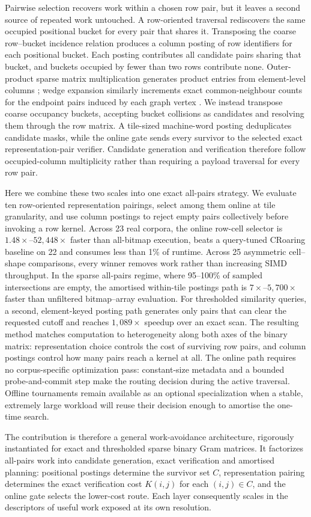 Pairwise selection recovers work within a chosen row pair, but it leaves a second source of repeated
work untouched. A row-oriented traversal rediscovers the same occupied positional bucket for every
pair that shares it. Transposing the coarse row--bucket incidence relation produces a column posting
of row identifiers for each positional bucket. Each posting contributes all candidate pairs sharing
that bucket, and buckets occupied by fewer than two rows contribute none. Outer-product sparse
matrix multiplication generates product entries from element-level columns
\cite{gustavson1978spgemm,buluc2011combinatorialblas}; wedge expansion similarly increments exact
common-neighbour counts for the endpoint pairs induced by each graph vertex
\cite{an2019skipintersection}. We instead transpose coarse occupancy buckets, accepting bucket
collisions as candidates and resolving them through the row matrix. A tile-sized machine-word
posting deduplicates candidate masks, while the online gate sends every survivor to the selected
exact representation-pair verifier. Candidate
generation and verification therefore follow occupied-column multiplicity rather than requiring a
payload traversal for every row pair.

Here we combine these two scales into one exact all-pairs strategy. We evaluate ten row-oriented
representation pairings, select among them online at tile granularity, and use column postings to
reject empty pairs collectively before invoking a row kernel. Across 23 real corpora, the online
row-cell selector is $1.48\times$--$52{,}448\times$ faster than all-bitmap execution, beats a
query-tuned CRoaring baseline on 22 and consumes less than 1\% of runtime.
Across 25 asymmetric cell--shape comparisons, every winner removes work rather than increasing SIMD
throughput. In the sparse all-pairs regime, where 95--100\% of sampled intersections are empty, the
amortised within-tile postings path is $7\times$--$5{,}700\times$ faster than unfiltered
bitmap--array evaluation. For thresholded similarity queries, a second, element-keyed posting path
generates only pairs that can clear the requested cutoff and reaches $1{,}089\times$ speedup over an
exact scan. The resulting method matches computation to heterogeneity along both axes of the binary
matrix: representation choice controls the cost of surviving row pairs, and column postings control
how many pairs reach a kernel at all. The online path requires no corpus-specific optimization pass:
constant-size metadata and a bounded probe-and-commit step make the routing decision during the
active traversal. Offline tournaments remain available as an optional specialization when a stable,
extremely large workload will reuse their decision enough to amortise the one-time search.

The contribution is therefore a general work-avoidance architecture, rigorously instantiated for
exact and thresholded sparse binary Gram matrices. It factorizes all-pairs work into candidate
generation, exact verification and amortised planning: positional postings determine the survivor
set $C$, representation pairing determines the exact verification cost $K(i,j)$ for each
$(i,j)\in C$, and the online gate selects
the lower-cost route. Each layer consequently scales in the descriptors of useful work exposed at
its own resolution.
